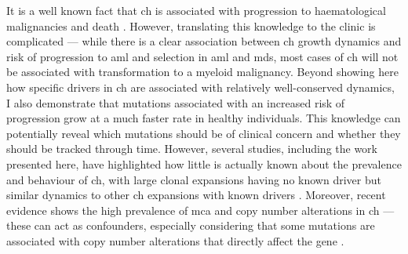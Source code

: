 It is a well known fact that \ac{ch} is associated with progression to haematological malignancies and death \cite{Genovese2014-eu,Jaiswal2014-rl,Abelson2018-wh}. However, translating this knowledge to the clinic is complicated --- while there is a clear association between \ac{ch} growth dynamics and risk of progression to \ac{aml} and selection in \ac{aml} and \ac{mds}, most cases of \ac{ch} will not be associated with transformation to a myeloid malignancy. Beyond showing here how specific drivers in \ac{ch} are associated with relatively well-conserved dynamics, I also demonstrate that mutations associated with an increased risk of progression grow at a much faster rate in healthy individuals. This knowledge can potentially reveal which mutations should be of clinical concern and whether they should be tracked through time. However, several studies, including the work presented here, have highlighted how little is actually known about the prevalence and behaviour of \ac{ch}, with large clonal expansions having no known driver but similar dynamics to other \ac{ch} expansions with known drivers \cite{Poon2020-ek,Mitchell2021-zl,Fabre2021-uw}. Moreover, recent evidence shows the high prevalence of \ac{mca} and copy number alterations in \ac{ch} --- these can act as confounders, especially considering that some mutations are associated with copy number alterations that directly affect the gene \cite{Gao2021-ph,Saiki2021-sq}. 

